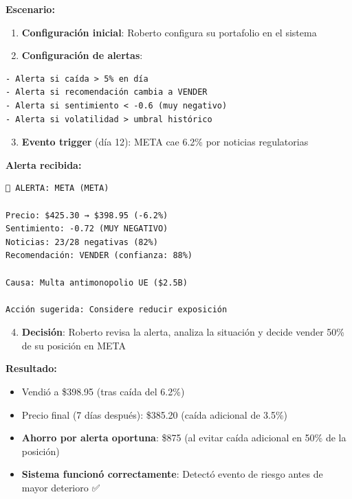 \documentclass[12pt,a4paper]{report}
\begin{document}
\textbf{Escenario:}

\begin{enumerate}
    \item \textbf{Configuración inicial}: Roberto configura su portafolio en el sistema
    \item \textbf{Configuración de alertas}:
\end{enumerate}

\begin{lstlisting}[language={}]
- Alerta si caída > 5% en día
- Alerta si recomendación cambia a VENDER
- Alerta si sentimiento < -0.6 (muy negativo)
- Alerta si volatilidad > umbral histórico
\end{lstlisting}

\begin{enumerate}
    \setcounter{enumi}{2}
    \item \textbf{Evento trigger} (día 12): META cae 6.2\% por noticias regulatorias
\end{enumerate}

\textbf{Alerta recibida:}
\begin{lstlisting}[language={}]
🚨 ALERTA: META (META)

Precio: $425.30 → $398.95 (-6.2%)
Sentimiento: -0.72 (MUY NEGATIVO)
Noticias: 23/28 negativas (82%)
Recomendación: VENDER (confianza: 88%)

Causa: Multa antimonopolio UE ($2.5B)

Acción sugerida: Considere reducir exposición
\end{lstlisting}

\begin{enumerate}
    \setcounter{enumi}{3}
    \item \textbf{Decisión}: Roberto revisa la alerta, analiza la situación y decide vender 50\% de su posición en META
\end{enumerate}

\textbf{Resultado:}
\begin{itemize}
    \item Vendió a \$398.95 (tras caída del 6.2\%)
    \item Precio final (7 días después): \$385.20 (caída adicional de 3.5\%)
    \item \textbf{Ahorro por alerta oportuna}: \$875 (al evitar caída adicional en 50\% de la posición)
    \item \textbf{Sistema funcionó correctamente}: Detectó evento de riesgo antes de mayor deterioro ✅
\end{itemize}
\end{document}
